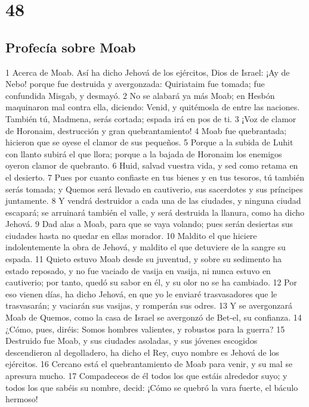 \chapter{48}

\section*{Profecía sobre Moab}

1 Acerca de Moab. Así ha dicho Jehová de los ejércitos, Dios de Israel: ¡Ay de Nebo! porque fue destruida y avergonzada: Quiriataim fue tomada; fue confundida Misgab, y desmayó.
2 No se alabará ya más Moab; en Hesbón maquinaron mal contra ella, diciendo: Venid, y quitémosla de entre las naciones. También tú, Madmena, serás cortada; espada irá en pos de ti.
3 ¡Voz de clamor de Horonaim, destrucción y gran quebrantamiento! 
4 Moab fue quebrantada; hicieron que se oyese el clamor de sus pequeños.
5 Porque a la subida de Luhit con llanto subirá el que llora; porque a la bajada de Horonaim los enemigos oyeron clamor de quebranto.
6 Huid, salvad vuestra vida, y sed como retama en el desierto.
7 Pues por cuanto confiaste en tus bienes y en tus tesoros, tú también serás tomada; y Quemos será llevado en cautiverio, sus sacerdotes y sus príncipes juntamente.
8 Y vendrá destruidor a cada una de las ciudades, y ninguna ciudad escapará; se arruinará también el valle, y será destruida la llanura, como ha dicho Jehová.
9 Dad alas a Moab, para que se vaya volando; pues serán desiertas sus ciudades hasta no quedar en ellas morador.
10 Maldito el que hiciere indolentemente la obra de Jehová, y maldito el que detuviere de la sangre su espada.
11 Quieto estuvo Moab desde su juventud, y sobre su sedimento ha estado reposado, y no fue vaciado de vasija en vasija, ni nunca estuvo en cautiverio; por tanto, quedó su sabor en él, y su olor no se ha cambiado.
12 Por eso vienen días, ha dicho Jehová, en que yo le enviaré trasvasadores que le trasvasarán; y vaciarán sus vasijas, y romperán sus odres.
13 Y se avergonzará Moab de Quemos, como la casa de Israel se avergonzó de Bet-el, su confianza.
14 ¿Cómo, pues, diréis: Somos hombres valientes, y robustos para la guerra?
15 Destruido fue Moab, y sus ciudades asoladas, y sus jóvenes escogidos descendieron al degolladero, ha dicho el Rey, cuyo nombre es Jehová de los ejércitos.
16 Cercano está el quebrantamiento de Moab para venir, y su mal se apresura mucho.
17 Compadeceos de él todos los que estáis alrededor suyo; y todos los que sabéis su nombre, decid: ¡Cómo se quebró la vara fuerte, el báculo hermoso!
